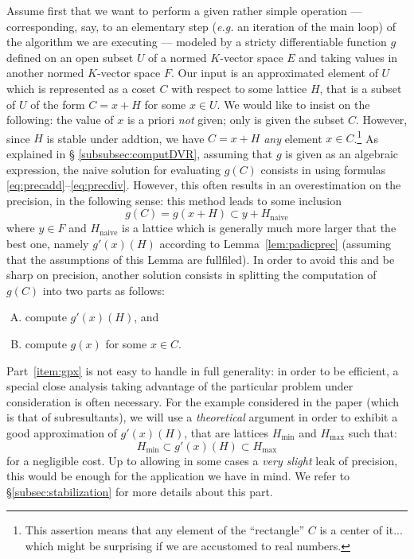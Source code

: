 \documentclass{article}
\begin{document}
Assume first that we want to perform a given rather simple operation --- 
corresponding, say, to an elementary step (\emph{e.g.} an iteration of 
the main loop) of the algorithm we are executing --- modeled by a 
stricty differentiable function $g$ defined on an open subset $U$ of a 
normed $K$-vector space $E$ and taking values in another normed 
$K$-vector space $F$.
Our input is an approximated element of $U$ which is represented 
as a coset $C$ with respect to some lattice $H$, that is a subset of $U$ 
of the form $C = x+H$ for some $x \in U$. We would like to insist on the 
following: the value of $x$ is a priori \emph{not} given; only is given 
the subset $C$. However, since $H$ is stable under addtion, we have $C = 
x+H$ \emph{any} element $x \in C$.\footnote{This assertion means that 
any element of the ``rectangle'' $C$ is a center of it... which might be 
surprising if we are accustomed to real numbers.} As explained in \S 
\ref{subsubsec:computDVR}, assuming that $g$ is given as an algebraic 
expression, the naive solution for evaluating $g(C)$ consists in using 
formulas \eqref{eq:precadd}--\eqref{eq:precdiv}. However, this often 
results in an overestimation on the precision, in the following sense: 
this method leads to some inclusion
$$g(C) = g(x+H) \subset y + H_{\text{naive}}$$
where $y \in F$ and $H_{\text{naive}}$ is a lattice which is generally 
much more larger that the best one, namely $g'(x)(H)$ according to
Lemma~\ref{lem:padicprec} (assuming that the assumptions of this Lemma
are fullfiled). In order to avoid this and be sharp on
precision, another solution consists in splitting the computation of 
$g(C)$ into two parts as follows:
\begin{enumerate}[(A)]
\item \label{item:gpx} compute $g'(x)(H)$, and
\item \label{item:gx} compute $g(x)$ for some $x \in C$.
\end{enumerate}
Part~\eqref{item:gpx} is not easy to handle in full generality: in order 
to be efficient, a special close analysis taking advantage of the 
particular problem under consideration is often necessary. For the 
example considered in the paper (which is that of subresultants), we will 
use a \emph{theoretical} argument in order to exhibit a good approximation 
of $g'(x)(H)$, that are lattices $H_\min$ and $H_\max$ such that:
\begin{equation}
\label{eq:Hminmax}
H_\min \subset g'(x)(H) \subset H_\max
\end{equation}
for a negligible cost. Up to allowing in some cases a \emph{very slight} 
leak of precision, this would be enough for the application we have in 
mind. We refer to \S \ref{subsec:stabilization} for more details about
this part.
\end{document}
